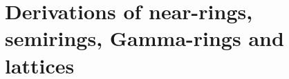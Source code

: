 \chapter{Derivations of near-rings, semirings, Gamma-rings and lattices}\label{ch:other-systems}







